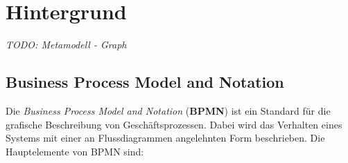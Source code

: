 \chapter{Hintergrund}
\label{chap:background}

\textit{TODO: Metamodell - Graph}

\section{Business Process Model and Notation}

Die \emph{Business Process Model and Notation} (\textbf{BPMN}) ist ein Standard für die grafische Beschreibung von Geschäftsprozessen.
Dabei wird das Verhalten eines Systems mit einer an Flussdiagrammen angelehnten Form beschrieben.
Die Hauptelemente von BPMN sind:

